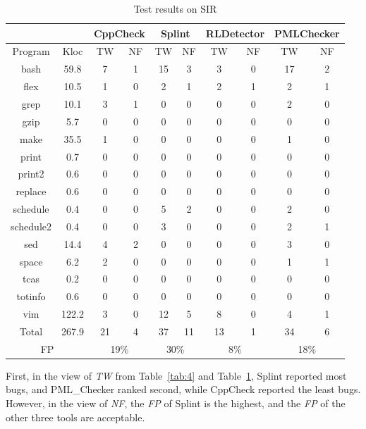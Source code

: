 \begin{table}[!h]
\centering
\setlength{\abovecaptionskip}{0pt}%
\setlength{\belowcaptionskip}{10pt}%
\caption{Test results on SIR}\label{tab:5}
\centering
\begin{tabular}{|c|c|c|c|c|c|c|c|c|c|}
\hline
&  & \multicolumn{2}{|c|}{\textbf\small{CppCheck}} & \multicolumn{2}{|c|}{\textbf\small{Splint}} &           \multicolumn{2}{|c|}{\textbf\small{RLDetector}} & \multicolumn{2}{|c|}{\textbf\small{PMLChecker}}\\
\hline
\textbf\small{Program} & \textbf\small{Kloc} & \textbf\small{TW} & \textbf\small{NF} & \textbf\small{TW} & \textbf\small{NF} & \textbf\small{TW} & \textbf\small{NF} & \textbf\small{TW} & \textbf\small{NF}\\
\hline
bash       & 59.8 &7	&1	  & 15  & 3  & 3	 & 0   & 17  & 2\\
\hline
flex	       & 10.5  & 1	& 0	  & 2    & 1  & 2	 & 1	   & 2   & 1\\
\hline
grep	 & 10.1 & 3	& 1	  & 0    & 0  & 0	 & 0	   & 2   & 0\\
\hline
gzip	       & 5.7   & 0	& 0	  & 0    & 0  & 0	 & 0	   & 0   & 0\\
\hline
make	 & 35.5 &1	& 0	  & 0    & 0  & 0	 & 0	   & 1   & 0\\
\hline
print	 & 0.7   &  0	& 0	  & 0    & 0  & 0	 & 0	   & 0   & 0\\
\hline
print2	 & 0.6   & 0	& 0	  & 0    & 0  & 0	 & 0   &	0   & 0\\
\hline
replace    & 0.6   & 0	& 0	  & 0    & 0  & 0	 & 0	   & 0   & 0\\
\hline
schedule  & 0.4	& 0	& 0	  & 5    & 2  & 0	 & 0	   & 2   & 0\\
\hline
schedule2 & 0.4	& 0	& 0    & 3    & 0  & 0	 & 0	   & 2   & 1\\
\hline
sed	        & 14.4	& 4	& 2    &	0   & 0  & 0	 & 0	   & 3   & 0\\
\hline
space	 & 6.2	& 2	& 0	   & 0   & 0  & 0	 & 0	   & 1   & 1\\
\hline
tcas	       & 0.2	& 0	& 0    &	0   & 0  & 0	 & 0    & 0   & 0\\
\hline
totinfo	 & 0.6	& 0  & 0	   & 0    & 0  & 0	 & 0	   & 0   & 0\\
\hline
vim        & 122.2	& 3	& 0	   & 12  & 5  & 8	 & 0	   & 4   & 1\\
\hline
Total	 & 267.9	 & 21&4	   & 37  & 11 & 13 & 1   & 34  & 6\\
\hline
\multicolumn{2}{|c|}{FP} & \multicolumn{2}{|c|}{19\%} & \multicolumn{2}{|c|}{30\%} & \multicolumn{2}{|c|}{8\%} & \multicolumn{2}{|c|}{18\%}\\
\hline
\end{tabular}
\end{table}
First, in the view of \textit{TW} from Table~\ref{tab:4} and Table~\ref{tab:5}, Splint reported most bugs, and PML\_Checker ranked second, while CppCheck reported the least bugs. However, in the view of \textit{NF}, the \textit{FP} of Splint is the highest, and the \textit{FP} of the other three tools are acceptable.

